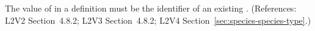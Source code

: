 The value of  in a \Species definition must be the
identifier of an existing \SpeciesType.  (References: L2V2
Section~4.8.2; L2V3 Section~4.8.2; L2V4 Section~\ref{sec:species-species-type}.)
